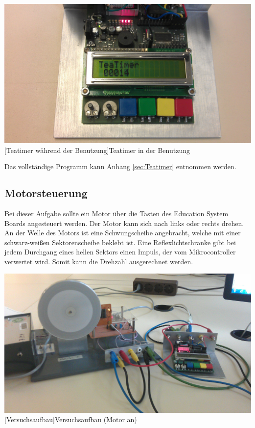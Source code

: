 \documentclass[12pt,a4paper,bibliography=totocnumbered,listof=totocnumbered]{scrartcl}
\begin{document}
\vspace{1em}
\begin{minipage}{\linewidth}
	\centering
	\includegraphics[width=0.7\linewidth]{img/TeaTimer2.jpg}
	[Teatimer während der Benutzung]{Teatimer in der Benutzung}
	\label{fig:Teatimer}
\end{minipage}

\vspace{1em}
Das vollständige Programm kann Anhang \ref{sec:Teatimer} entnommen werden.

\pagebreak

\subsection{Motorsteuerung}
Bei dieser Aufgabe sollte ein Motor über die Tasten des Education System Boards angesteuert werden. Der Motor kann sich nach links oder rechts drehen. An der Welle des Motors ist eine Schwungscheibe angebracht, welche mit einer schwarz-weißen Sektorenscheibe beklebt ist. Eine Reflexlichtschranke gibt bei jedem Durchgang eines hellen Sektors einen Impuls, der vom Mikrocontroller verwertet wird. Somit kann die Drehzahl ausgerechnet werden.

\vspace{1em}
\begin{minipage}{\linewidth}
	\centering
	\includegraphics[width=0.7\linewidth]{img/MotorAufbau.jpg}
	[Versuchsaufbau]{Versuchsaufbau (Motor an)}
	\label{fig:MotorAufbau}
\end{minipage}
\end{document}
